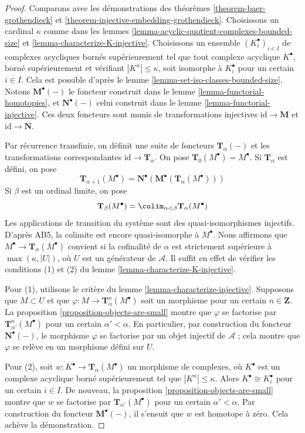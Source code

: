 \begin{proof}
Comparons avec les démonstrations des
théorèmes \ref{theorem-baer-grothendieck} et
\ref{theorem-injective-embedding-grothendieck}.
Choisissons un cardinal $\kappa$ comme dans les
lemmes \ref{lemma-acyclic-quotient-complexes-bounded-size} et
\ref{lemma-characterize-K-injective}.
Choisissons un ensemble $(K_i^\bullet)_{i \in I}$ de complexes acycliques
bornés supérieurement tel que tout complexe acyclique $K^\bullet$, borné
supérieurement et vérifiant $|K^n| \leq \kappa$, soit isomorphe à
$K_i^\bullet$ pour un certain $i \in I$. Cela est possible d'après le
lemme \ref{lemma-set-iso-classes-bounded-size}.
Notons $\mathbf{M}^\bullet(-)$ le foncteur construit dans le
lemme \ref{lemma-functorial-homotopies}, et
$\mathbf{N}^\bullet(-)$ celui construit dans le
lemme \ref{lemma-functorial-injective}.
Ces deux foncteurs sont munis de transformations injectives
$\text{id} \to \mathbf{M}$ et $\text{id} \to \mathbf{N}$.

\medskip\noindent
Par récurrence transfinie, on définit une suite de foncteurs
$\mathbf{T}_\alpha(-)$ et les transformations correspondantes
$\text{id} \to \mathbf{T}_\alpha$. On pose
$\mathbf{T}_0(M^\bullet) = M^\bullet$. Si $\mathbf{T}_\alpha$ est défini,
on pose
$$
\mathbf{T}_{\alpha + 1}(M^\bullet) =
\mathbf{N}^\bullet(\mathbf{M}^\bullet(\mathbf{T}_\alpha(M^\bullet)))
$$
Si $\beta$ est un ordinal limite, on pose
$$
\mathbf{T}_\beta(M^\bullet) =
\colim_{\alpha < \beta} \mathbf{T}_\alpha(M^\bullet)
$$
Les applications de transition du système sont des quasi-isomorphismes
injectifs. D'après AB5, la colimite est encore quasi-isomorphe à $M^\bullet$.
Nous affirmons que $M^\bullet \to \mathbf{T}_\alpha(M^\bullet)$ convient si
la cofinalité de $\alpha$ est strictement supérieure à
$\max(\kappa, |U|)$, où $U$ est un générateur de $\mathcal{A}$.
Il suffit en effet de vérifier les conditions (1) et (2) du
lemme \ref{lemma-characterize-K-injective}.

\medskip\noindent
Pour (1), utilisons le critère du
lemme \ref{lemma-characterize-injective}.
Supposons que $M \subset U$ et que
$\varphi : M \to \mathbf{T}^n_\alpha(M^\bullet)$ soit un morphisme pour un
certain $n \in \mathbf{Z}$. La
proposition \ref{proposition-objects-are-small} montre que $\varphi$ se
factorise par $\mathbf{T}^n_{\alpha'}(M^\bullet)$ pour un certain
$\alpha' < \alpha$. En particulier, par construction du foncteur
$\mathbf{N}^\bullet(-)$, le morphisme $\varphi$ se factorise par un objet
injectif de $\mathcal{A}$ ; cela montre que $\varphi$ se relève en un morphisme
défini sur $U$.

\medskip\noindent
Pour (2), soit $w : K^\bullet \to \mathbf{T}_\alpha(M^\bullet)$ un morphisme
de complexes, où $K^\bullet$ est un complexe acyclique borné supérieurement
tel que $|K^n| \leq \kappa$. Alors $K^\bullet \cong K_i^\bullet$ pour un
certain $i \in I$. De nouveau, la
proposition \ref{proposition-objects-are-small} montre que $w$ se factorise
par $\mathbf{T}_{\alpha'}(M^\bullet)$ pour un certain $\alpha' < \alpha$.
Par construction du foncteur $\mathbf{M}^\bullet(-)$, il s'ensuit que $w$
est homotope à zéro. Cela achève la démonstration.
\end{proof}
